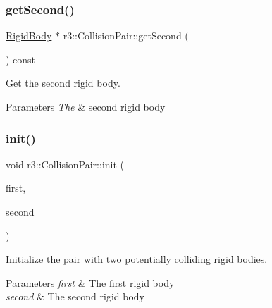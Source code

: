 \subsubsection{\texorpdfstring{get\+Second()}{getSecond()}}
{\footnotesize\ttfamily \mbox{\hyperlink{classr3_1_1_rigid_body}{Rigid\+Body}} $\ast$ r3\+::\+Collision\+Pair\+::get\+Second (\begin{DoxyParamCaption}{ }\end{DoxyParamCaption}) const}



Get the second rigid body. 


\begin{DoxyParams}{Parameters}
{\em The} & second rigid body \\
\hline
\end{DoxyParams}
\mbox{\label{classr3_1_1_collision_pair_a7e64e731162cfdc3222d8f02b7c886b1}} 
\subsubsection{\texorpdfstring{init()}{init()}}
{\footnotesize\ttfamily void r3\+::\+Collision\+Pair\+::init (\begin{DoxyParamCaption}\item[{\mbox{\hyperlink{classr3_1_1_rigid_body}{Rigid\+Body}} $\ast$}]{first,  }\item[{\mbox{\hyperlink{classr3_1_1_rigid_body}{Rigid\+Body}} $\ast$}]{second }\end{DoxyParamCaption})}



Initialize the pair with two potentially colliding rigid bodies. 


\begin{DoxyParams}{Parameters}
{\em first} & The first rigid body \\
\hline
{\em second} & The second rigid body \\
\hline
\end{DoxyParams}
\mbox{\label{classr3_1_1_collision_pair_a8d56c936cb56821247c5b1a684578c0a}} 
